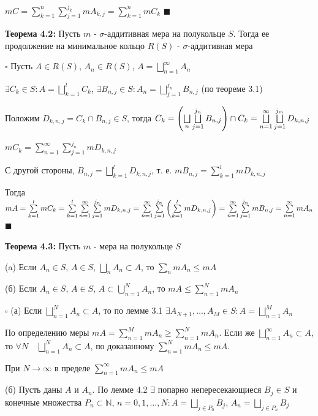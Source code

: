 \documentclass[a4paper]{report}
\newcommand*{\hm}[1]{#1\nobreak\discretionary{}%
            {\hbox{$\mathsurround=0pt #1$}}{}}
\begin{document}
$mC=\sum\limits_{k=1}^n\sum\limits_{j=1}^{j_k}mA_{k,j}=\sum\limits_{k=1}^n mC_k$ $\blacksquare$
\bigskip

\noindent\textbf{Теорема 4.2:} Пусть $m$ - $\sigma$-аддитивная мера на полукольце $S$. Тогда ее продолжение на минимальное 
кольцо $R(S)$ - $\sigma$-аддитивная мера

\noindent $\square$ Пусть $A\in R(S)$, $A_n\in R(S)$, $A=\bigsqcup\limits_{n=1}^\infty A_n$

$\exists C_k\in S\colon A=\bigsqcup\limits_{k=1}^l C_k$, $\exists B_{n,j}\in S\colon A_n=\bigsqcup\limits_{j=1}^{j_n} B_{n,j}$
(по теореме 3.1)

Положим $D_{k,n,j}=C_k\cap B_{n,j}\in S$, тогда $C_k=\left(\bigsqcup\limits_n\bigsqcup\limits_{j=1}^{j_n} B_{n,j}\right)\cap C_k\hm=
\bigsqcup\limits_{n=1}^\infty\bigsqcup\limits_{j=1}^{j_m} D_{k,n,j}$

$mC_k=\sum\limits_{n=1}^\infty\sum\limits_{j=1}^{j_n}mD_{k,n,j}$

С другой стороны, $B_{n,j}=\bigsqcup\limits_{k=1}^l D_{k,n,j}$, т. е. $mB_{n,j}=\sum\limits_{k=1}^l mD_{k,n,j}$

Тогда $mA=\sum\limits_{k=1}^l mC_k=\sum\limits_{k=1}^l\sum\limits_{n=1}^\infty\sum\limits_{j=1}^{j_n} mD_{k,n,j}=
\sum\limits_{n=1}^\infty\sum\limits_{j=1}^{j_n}\left(\sum\limits_{k=1}^l mD_{k,n,j}\right)\hm=\sum\limits_{n=1}^\infty
\sum\limits_{j=1}^{j_n}mB_{n,j}=\sum\limits_{n=1}^\infty mA_n$ $\blacksquare$
\bigskip

\noindent\textbf{Теорема 4.3:} Пусть $m$ - мера на полукольце $S$

(a) Если $A_n\in S$, $A\in S$, $\bigsqcup\limits_n A_n\subset A$, то $\sum\limits_n mA_n\le mA$

(б) Если $A_n\in S$, $A\in S$, $A\subset\bigcup\limits_{n=1}^N A_n$, то $mA\le\sum\limits_{n=1}^N mA_n$

\noindent $\square$ (а) Если $\bigsqcup\limits_{n=1}^N A_n\subset A$, то по лемме 3.1 $\exists A_{N+1},\ldots,A_M\in S\colon
A=\bigsqcup\limits_{n=1}^M A_n$

По определению меры $mA=\sum\limits_{n=1}^M mA_n\ge\sum\limits_{n=1}^N mA_n$. Если же $\bigsqcup\limits_{n=1}^\infty A_n\subset
A$, то $\forall N\quad\bigsqcup\limits_{n=1}^N A_n\subset A$, по доказанному $\sum\limits_{n=1}^N mA_n\le mA$.

При $N\to\infty$ в пределе $\sum\limits_{n=1}^\infty mA_n\le mA$

(б) Пусть даны $A$ и $A_n$. По лемме 4.2 $\exists$ попарно непересекающиеся $B_j\in S$ и конечные множества $P_n\subset
\mathbb N$, $n=0,1,\ldots,N\colon A=\bigsqcup\limits_{j\in P_0}B_j$, $A_n=\bigsqcup\limits_{j\in P_n}B_j$
\end{document}
